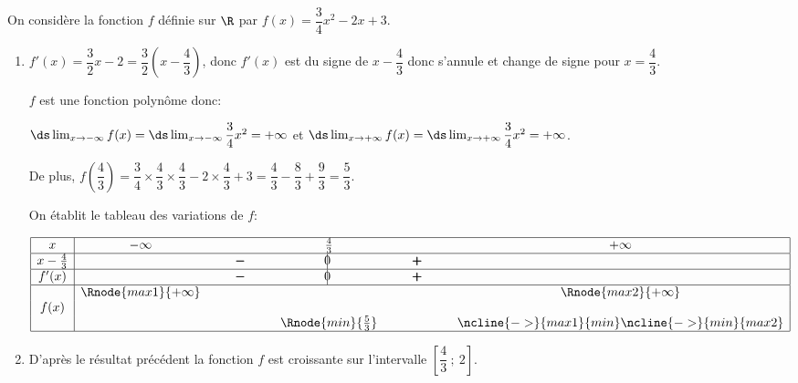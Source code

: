 
\medskip

On considère la fonction $f$ définie sur $\R$ par 
$f(x) = \dfrac34 x^2 - 2x + 3.$

\begin{enumerate}
\item %
$f'(x)=\dfrac{3}{2}x -2 = \dfrac{3}{2}\left (x-\dfrac{4}{3}\right )$, donc $f'(x)$ est du signe de $x-\dfrac{4}{3}$ donc s'annule et change de signe pour $x=\dfrac{4}{3}$.

$f$ est une fonction polynôme donc:

$\ds\lim_{x\to -\infty} f(x) = \ds\lim_{x\to -\infty} \dfrac{3}{4}x^2 = +\infty$
et
$\ds\lim_{x\to +\infty} f(x) = \ds\lim_{x\to +\infty} \dfrac{3}{4}x^2 = +\infty$.

De plus, $f\left(\dfrac43\right) = \dfrac34 \times \dfrac43 \times \dfrac43 - 2\times \dfrac43 + 3 = \dfrac43 - \dfrac83 + \dfrac93 = \dfrac53$.

On établit le tableau des variations de $f$:

\begin{center}
{\renewcommand{\arraystretch}{1.3}
\def\esp{\hspace*{1.5cm}}%
\def\hauteur{0pt}%
$\begin{array}{|c| *4{c} c|}
\hline
 x & -\infty & \esp & \frac{4}{3} & \esp & +\infty \\
\hline
x-\frac{4}{3} &  &  \pmb{-} & \vline\hspace{-2.7pt}0 & \pmb{+} & \\
 \hline
f'(x) &  &  \pmb{-} & \vline\hspace{-2.7pt}0 & \pmb{+} & \\  
\hline
  & \Rnode{max1}{+\infty}  &  &  &  & \Rnode{max2}{+\infty}   \\
f(x) & &  & & &  \rule{0pt}{\hauteur} \\
 &  & &   \Rnode{min}{\frac{5}{3}} & & \rule{0pt}{\hauteur}
\ncline{->}{max1}{min} \ncline{->}{min}{max2}\\
\hline
\end{array}$
}
\end{center}

\item %
D'après le résultat précédent la fonction $f$ est croissante sur l'intervalle $\left[\dfrac43~;~2\right]$.


\end{enumerate}
